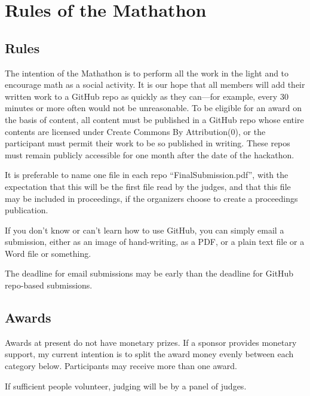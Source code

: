 \documentclass[11pt]{article}
\begin{document}
\section{Rules of the Mathathon}

\subsection{Rules}

The intention of the Mathathon is to perform all the work in the light and to encourage math
as a social activity.
It is our hope that all members will add their written work to a GitHub repo as quickly
as they can---for example, every 30 minutes or more often would not be unreasonable.
To be eligible for an award on the basis of content, all content must be published in a GitHub repo
whose entire contents are licensed under Create Commons By Attribution(0), or the
participant must permit their work to be so published in writing.
These repos must remain publicly accessible for one month after the date of the hackathon.

It is preferable to name one file in each repo ``FinalSubmission.pdf'', with the expectation that this
will be the first file read by the judges, and that this file may be included in proceedings, if the
organizers choose to create a proceedings publication.

If you don't know or can't learn how to use GitHub, you can simply email a submission,
either as an image of hand-writing, as a PDF, or a plain text file or a Word file or something.

The deadline for email submissions may be early than the deadline for GitHub repo-based submissions.

\subsection{Awards}

Awards at present do not have monetary prizes. If a sponsor provides monetary support, my current intention is to split
the award money evenly between each category below. Participants may receive more than one award.

If sufficient people volunteer, judging will be by a panel of judges.
\end{document}
